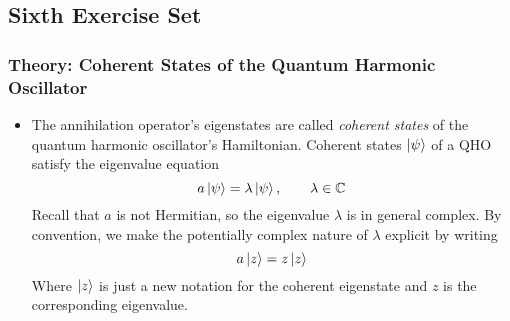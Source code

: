 \documentclass[11pt, a4paper]{article}
\begin{document}
\subsection{Sixth Exercise Set}

\subsubsection{Theory: Coherent States of the Quantum Harmonic Oscillator}
\begin{itemize}
	\item The annihilation operator's eigenstates are called \textit{coherent states} of the quantum harmonic oscillator's Hamiltonian. Coherent states  $ \ket{\psi} $ of a QHO satisfy the eigenvalue equation
	\begin{equation*}
		a \ket{\psi} = \lambda \ket{\psi}, \qquad \lambda \in \mathbb{C}
	\end{equation*}
	Recall that $ a $ is not Hermitian, so the eigenvalue $ \lambda $ is in general complex. By convention, we make the potentially complex nature of $ \lambda $ explicit by writing 
	\begin{equation*}
		a \ket{z} = z \ket{z}
	\end{equation*}
	Where $ \ket{z} $ is just a new notation for the coherent eigenstate and $ z $ is the corresponding eigenvalue.
	

\end{itemize}
\end{document}
